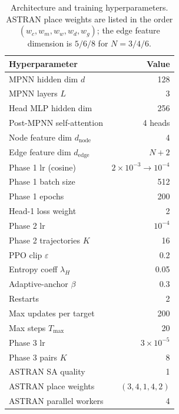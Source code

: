 \documentclass[letterpaper]{article}
\theoremstyle{plain}
\theoremstyle{definition}
\begin{document}
\begin{table}[h]
\centering
\small
\caption{Architecture and training hyperparameters.  ASTRAN place weights are
         listed in the order $(w_c, w_m, w_w, w_d, w_g)$; the edge feature
         dimension is $5/6/8$ for $N{=}3/4/6$.}
\label{tab:hparam}
\begin{tabular}{@{}lr@{}}
\toprule
\textbf{Hyperparameter}            & \textbf{Value} \\
\midrule
MPNN hidden dim $d$                & 128 \\
MPNN layers $L$                    & 3 \\
Head MLP hidden dim                & 256 \\
Post-MPNN self-attention           & 4 heads \\
Node feature dim $d_\mathrm{node}$ & 4 \\
Edge feature dim $d_\mathrm{edge}$ & $N+2$ \\
\midrule
Phase 1 lr (cosine)                & $2\times10^{-3}\!\to\!10^{-4}$ \\
Phase 1 batch size                 & 512 \\
Phase 1 epochs                     & 200 \\
Head-1 loss weight                 & 2 \\
\midrule
Phase 2 lr                         & $10^{-4}$ \\
Phase 2 trajectories $K$           & 16 \\
PPO clip $\varepsilon$             & 0.2 \\
Entropy coeff $\lambda_H$          & 0.05 \\
Adaptive-anchor $\beta$            & 0.3 \\
Restarts                           & 2 \\
Max updates per target             & 200 \\
Max steps $T_{\max}$               & 20 \\
\midrule
Phase 3 lr                         & $3 \times 10^{-5}$ \\
Phase 3 pairs $K$                  & 8 \\
ASTRAN SA quality                  & 1 \\
ASTRAN place weights               & $(3,4,1,4,2)$ \\
ASTRAN parallel workers            & 4 \\
\bottomrule
\end{tabular}
\end{table}
\end{document}
